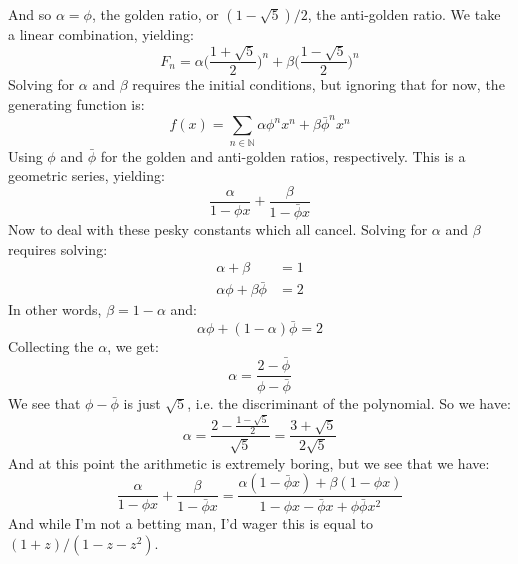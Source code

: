 \documentclass{article}
\begin{document}
        And so $\alpha=\phi$, the golden ratio, or $(1-\sqrt{5})/2$, the anti-golden ratio.
        We take a linear combination, yielding:
        \begin{equation}
            F_{n}=\alpha\Big(\frac{1+\sqrt{5}}{2}\Big)^{n}+
                \beta\Big(\frac{1-\sqrt{5}}{2}\Big)^{n}
        \end{equation}
        Solving for $\alpha$ and $\beta$ requires the initial conditions, but ignoring
        that for now, the generating function is:
        \begin{equation}
            f(x)=\sum_{n\in\mathbb{N}}\alpha\phi^{n}x^{n}+\beta\bar{\phi}^{n}x^{n}
        \end{equation}
        Using $\phi$ and $\bar{\phi}$ for the golden and anti-golden ratios,
        respectively. This is a geometric series, yielding:
        \begin{equation}
            \frac{\alpha}{1-\phi{x}}+\frac{\beta}{1-\bar{\phi}x}
        \end{equation}
        Now to deal with these pesky constants which all cancel. Solving for $\alpha$
        and $\beta$ requires solving:
        \begin{subequations}
            \begin{align}
                \alpha+\beta&=1\\
                \alpha\phi+\beta\bar{\phi}&=2
            \end{align}
        \end{subequations}
        In other words, $\beta=1-\alpha$ and:
        \begin{equation}
            \alpha\phi+(1-\alpha)\bar{\phi}=2
        \end{equation}
        Collecting the $\alpha$, we get:
        \begin{equation}
            \alpha=\frac{2-\bar{\phi}}{\phi-\bar{\phi}}
        \end{equation}
        We see that $\phi-\bar{\phi}$ is just $\sqrt{5}$, i.e. the discriminant of the
        polynomial. So we have:
        \begin{equation}
            \alpha=\frac{2-\frac{1-\sqrt{5}}{2}}{\sqrt{5}}
                =\frac{3+\sqrt{5}}{2\sqrt{5}}
        \end{equation}
        And at this point the arithmetic is extremely boring, but we see that we have:
        \begin{equation}
            \frac{\alpha}{1-\phi{x}}+\frac{\beta}{1-\bar{\phi}x}
                =\frac{\alpha(1-\bar{\phi}x) + \beta(1-\phi{x})}
                    {1-\phi{x}-\bar{\phi}x+\phi\bar{\phi}x^{2}}
        \end{equation}
        And while I'm not a betting man, I'd wager this is equal to
        $(1+z)/(1-z-z^{2})$.
\end{document}
